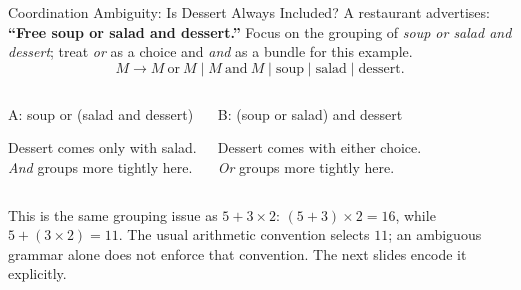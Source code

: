 \documentclass[10pt]{beamer}
\begin{document}
\begin{frame}{Coordination Ambiguity: Is Dessert Always Included?}
  \small
  A restaurant advertises: \textbf{``Free soup or salad and dessert.''}
  Focus on the grouping of \emph{soup or salad and dessert}; treat
  \emph{or} as a choice and \emph{and} as a bundle for this example.
  \[
    M\to M\ \text{or}\ M\mid M\ \text{and}\ M
      \mid\text{soup}\mid\text{salad}\mid\text{dessert}.
  \]
  \begin{columns}[T]
    \begin{block}{A: soup or (salad and dessert)}
      \centering
      \par\smallskip
      Dessert comes only with salad.\\
      \emph{And} groups more tightly here.
    \end{block}
    \begin{block}{B: (soup or salad) and dessert}
      \centering
      \par\smallskip
      Dessert comes with either choice.\\
      \emph{Or} groups more tightly here.
    \end{block}
  \end{columns}
  \pause
  This is the same grouping issue as $5+3\times2$:
  $(5+3)\times2=16$, while $5+(3\times2)=11$.
  The usual arithmetic convention selects $11$; an ambiguous grammar alone
  does not enforce that convention. The next slides encode it explicitly.
\end{frame}
\end{document}
